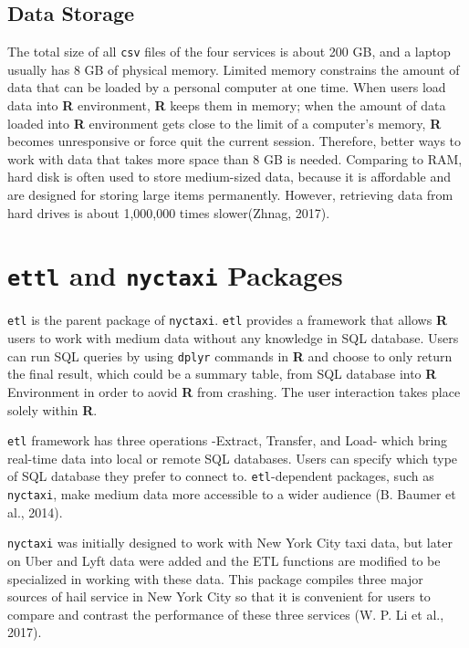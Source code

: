 \documentclass[12pt,twoside]{reedthesis}
\theoremstyle{definition}
\theoremstyle{definition}
\theoremstyle{definition}
\theoremstyle{remark}
\begin{document}
\subsection{Data Storage}\label{data-storage}

The total size of all \texttt{csv} files of the four services is about
200 GB, and a laptop usually has 8 GB of physical memory. Limited memory
constrains the amount of data that can be loaded by a personal computer
at one time. When users load data into \textbf{R} environment,
\textbf{R} keeps them in memory; when the amount of data loaded into
\textbf{R} environment gets close to the limit of a computer's memory,
\textbf{R} becomes unresponsive or force quit the current session.
Therefore, better ways to work with data that takes more space than 8 GB
is needed. Comparing to RAM, hard disk is often used to store
medium-sized data, because it is affordable and are designed for storing
large items permanently. However, retrieving data from hard drives is
about 1,000,000 times slower(Zhnag, 2017).

\section{\texorpdfstring{\texttt{ettl} and \texttt{nyctaxi}
Packages}{ettl and nyctaxi Packages}}\label{ettl-and-nyctaxi-packages}

\texttt{etl} is the parent package of \texttt{nyctaxi}. \texttt{etl}
provides a framework that allows \textbf{R} users to work with medium
data without any knowledge in SQL database. Users can run SQL queries by
using \texttt{dplyr} commands in \textbf{R} and choose to only return
the final result, which could be a summary table, from SQL database into
\textbf{R} Environment in order to aovid \textbf{R} from crashing. The
user interaction takes place solely within \textbf{R}.

\texttt{etl} framework has three operations -Extract, Transfer, and
Load- which bring real-time data into local or remote SQL databases.
Users can specify which type of SQL database they prefer to connect to.
\texttt{etl}-dependent packages, such as \texttt{nyctaxi}, make medium
data more accessible to a wider audience (B. Baumer et al., 2014).

\texttt{nyctaxi} was initially designed to work with New York City taxi
data, but later on Uber and Lyft data were added and the ETL functions
are modified to be specialized in working with these data. This package
compiles three major sources of hail service in New York City so that it
is convenient for users to compare and contrast the performance of these
three services (W. P. Li et al., 2017).
\end{document}
